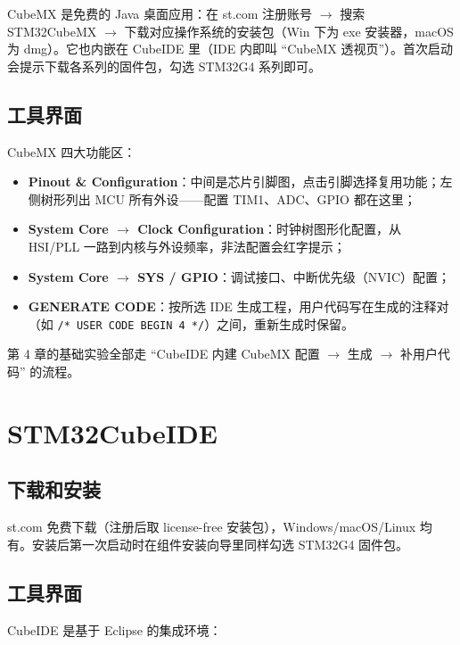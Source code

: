 \documentclass[
  UTF8,
  scheme=plain,
  fontsize=10pt,
  openany
]{ctexbook}
\begin{document}
CubeMX 是免费的 Java 桌面应用：在 st.com 注册账号 \(\rightarrow\) 搜索
STM32CubeMX \(\rightarrow\) 下载对应操作系统的安装包（Win 下为 exe
安装器，macOS 为 dmg）。它也内嵌在 CubeIDE 里（IDE 内即叫 ``CubeMX
透视页''）。首次启动会提示下载各系列的固件包，勾选 STM32G4 系列即可。

\subsection{工具界面}\label{ux5de5ux5177ux754cux9762}

CubeMX 四大功能区：

\begin{itemize}
\tightlist
\item
  \textbf{Pinout \&
  Configuration}：中间是芯片引脚图，点击引脚选择复用功能；左侧树形列出
  MCU 所有外设------配置 TIM1、ADC、GPIO 都在这里；
\item
  \textbf{System Core \(\rightarrow\) Clock
  Configuration}：时钟树图形化配置，从 HSI/PLL
  一路到内核与外设频率，非法配置会红字提示；
\item
  \textbf{System Core \(\rightarrow\) SYS /
  GPIO}：调试接口、中断优先级（NVIC）配置；
\item
  \textbf{GENERATE CODE}：按所选 IDE
  生成工程，用户代码写在生成的注释对（如
  \texttt{/*\ USER\ CODE\ BEGIN\ 4\ */}）之间，重新生成时保留。
\end{itemize}

第 4 章的基础实验全部走 ``CubeIDE 内建 CubeMX 配置 \(\rightarrow\) 生成
\(\rightarrow\) 补用户代码'' 的流程。

\section{STM32CubeIDE}\label{stm32cubeide}

\subsection{下载和安装}\label{ux4e0bux8f7dux548cux5b89ux88c5-1}

st.com 免费下载（注册后取 license-free 安装包），Windows/macOS/Linux
均有。安装后第一次启动时在组件安装向导里同样勾选 STM32G4 固件包。

\subsection{工具界面}\label{ux5de5ux5177ux754cux9762-1}

CubeIDE 是基于 Eclipse 的集成环境：
\end{document}
